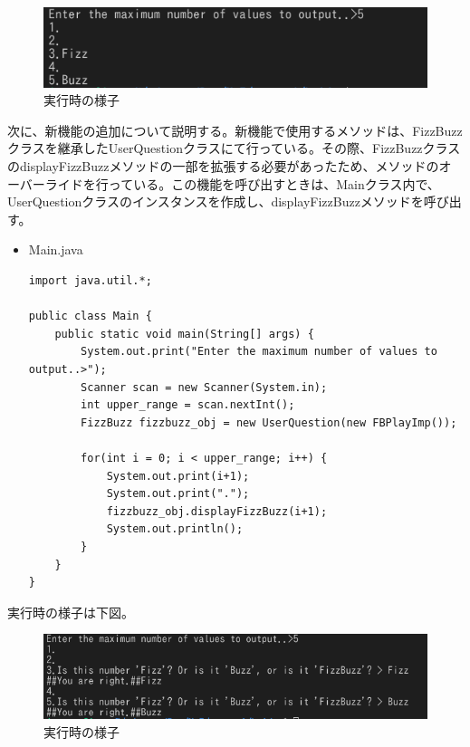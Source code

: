\documentclass[dvipdfmx]{jsarticle}
\begin{document}
\begin{figure}[H]
  \centering
  \includegraphics[scale=0.6]{ImgMovies/prod02-result1.png}
  \caption{実行時の様子}
\end{figure}
次に、新機能の追加について説明する。新機能で使用するメソッドは、FizzBuzzクラスを継承したUserQuestionクラスにて行っている。その際、FizzBuzzクラスのdisplayFizzBuzzメソッドの一部を拡張する必要があったため、メソッドのオーバーライドを行っている。この機能を呼び出すときは、Mainクラス内で、UserQuestionクラスのインスタンスを作成し、displayFizzBuzzメソッドを呼び出す。
\begin{itemize}
  \item Main.java
  \begin{verbatim}
import java.util.*;

public class Main {
    public static void main(String[] args) {
        System.out.print("Enter the maximum number of values to output..>");
        Scanner scan = new Scanner(System.in);
        int upper_range = scan.nextInt();
        FizzBuzz fizzbuzz_obj = new UserQuestion(new FBPlayImp());

        for(int i = 0; i < upper_range; i++) {
            System.out.print(i+1);
            System.out.print(".");
            fizzbuzz_obj.displayFizzBuzz(i+1);
            System.out.println();
        }
    }
}
  \end{verbatim}
\end{itemize}
  実行時の様子は下図。
  \begin{figure}[H]
    \centering
    \includegraphics[scale=0.6]{ImgMovies/prod02-result2.png}
    \caption{実行時の様子}
  \end{figure}
\end{document}
